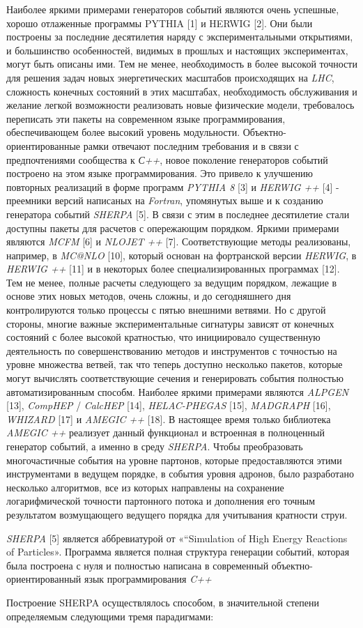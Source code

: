 Наиболее яркими примерами генераторов событий являются очень успешные, хорошо отлаженные программы
PYTHIA [1] и HERWIG [2]. Они были построены за последние десятилетия наряду с экспериментальными открытиями, и большинство особенностей, видимых в прошлых и настоящих экспериментах, могут быть описаны
ими. Тем не менее, необходимость в более высокой точности для решения задач новых энергетических масштабов происходящих
на \textit{LHC}, сложность конечных состояний в этих масштабах, необходимость обслуживания и желание легкой возможности реализовать новые физические модели, требовалось переписать эти пакеты на современном языке программирования, обеспечивающем более высокий уровень модульности. Объектно-ориентированные рамки отвечают последним
требования и в связи с предпочтениями сообщества к \textit{С++}, новое поколение генераторов событий
построено на этом языке программирования. Это привело к улучшению повторных реализаций в форме
программ \textit{PYTHIA 8} [3] и \textit{HERWIG ++} [4] - преемники версий написаных на \textit{Fortran}, упомянутых выше
и к созданию генератора событий \textit{SHERPA} [5].
В связи с этим в последнее десятилетие стали доступны пакеты для расчетов с опережающим порядком. Яркими примерами являются \textit{MCFM} [6] и \textit{NLOJET ++} [7]. Соответствующие методы реализованы, например, в \textit{MC@NLO} [10], который основан
на фортранской версии \textit{HERWIG}, в \textit{HERWIG ++} [11] и в некоторых более специализированных программах [12].
Тем не менее, полные расчеты следующего за ведущим порядком, лежащие в основе этих новых методов, очень сложны, и до сегодняшнего дня контролируются только процессы с пятью внешними ветвями. Но
с другой стороны, многие важные экспериментальные сигнатуры зависят от конечных состояний с более высокой кратностью, что
инициировало существенную деятельность по совершенствованию методов и инструментов с точностью на уровне множества ветвей, так что
теперь доступно несколько пакетов, которые могут вычислять соответствующие сечения и генерировать события
полностью автоматизированным способм. Наиболее яркими примерами являются \textit{ALPGEN} [13], \textit{CompHEP} / \textit{CalcHEP} [14],
\textit{HELAC-PHEGAS} [15], \textit{MADGRAPH} [16], \textit{WHIZARD} [17] и \textit{AMEGIC ++} [18]. В настоящее время только библиотека \textit{AMEGIC ++} реализует данный функционал и встроенная в полноценный генератор событий, а именно в среду \textit{SHERPA}. Чтобы
преобразовать многочастичные события на уровне партонов, которые предоставляются этими инструментами в ведущем порядке, в
события уровня адронов, было разработано несколько алгоритмов, все из которых направлены на сохранение логарифмической
точности партонного потока и дополнения его точным результатом возмущающего ведущего порядка для
учитывания кратности струи.

\textit{SHERPA} [5] является аббревиатурой от «“Simulation of High Energy Reactions of Particles». Программа является
полная структура генерации событий, которая была построена с нуля и полностью написана в
современный объектно-ориентированный язык программирования \textit{C++}

Построение SHERPA осуществлялось способом, в значительной степени определяемым следующими тремя парадигмами:


